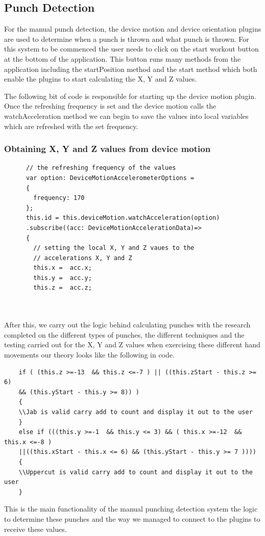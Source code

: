 \documentclass[a4paper,12pt]{report}
\begin{document}
\subsection{Punch Detection}
For the manual punch detection, the device motion and device orientation plugins are used to determine when a punch is thrown and what punch is thrown. 
For this system to be commenced the user needs to click on the start workout button at the bottom of the application.
This button runs many methods from the application including the startPosition method and the start method which both enable the plugins to start calculating the X, Y and Z values.

The following bit of code is responsible for starting up the device motion plugin.
Once the refreshing frequency is set and the device motion calls the watchAcceleration method we can begin to save the values into local variables which are refreshed with the set frequency. \\

\subsubsection{Obtaining X, Y and Z values from device motion}
\begin{verbatim} 
      // the refreshing frequency of the values 
      var option: DeviceMotionAccelerometerOptions = 
      {
        frequency: 170
      };
      this.id = this.deviceMotion.watchAcceleration(option)
      .subscribe((acc: DeviceMotionAccelerationData)=>
      {
        // setting the local X, Y and Z vaues to the 
        // accelerations X, Y and Z 
        this.x =  acc.x;
        this.y =  acc.y;
        this.z =  acc.z;   
\end{verbatim}\\
\\

After this, we carry out the logic behind calculating punches with the research completed on the different types of punches, the different techniques and the testing carried out for the X, Y and Z values when exercising these different hand movements our theory looks like the following in code.
\newpage
\begin{verbatim}
    if ( (this.z >=-13  && this.z <=-7 ) || ((this.zStart - this.z >= 6) 
    && (this.yStart - this.y >= 8)) ) 
    {
    \\Jab is valid carry add to count and display it out to the user
    }
    else if (((this.y >=-1  && this.y <= 3) && ( this.x >=-12  && this.x <=-8 )
    ||((this.xStart - this.x <= 6) && (this.yStart - this.y >= 7 )))) 
    {
    \\Uppercut is valid carry add to count and display it out to the user
    }
\end{verbatim}
This is the main functionality of the manual punching detection system the logic to determine these punches and the way we managed to connect to the plugins to receive these values.
\end{document}
